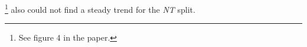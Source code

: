 \citet{aug_zhang2019aspectbased}\footnote{See figure 4 in the paper.} also could not find a steady trend for the \textit{NT} split.


